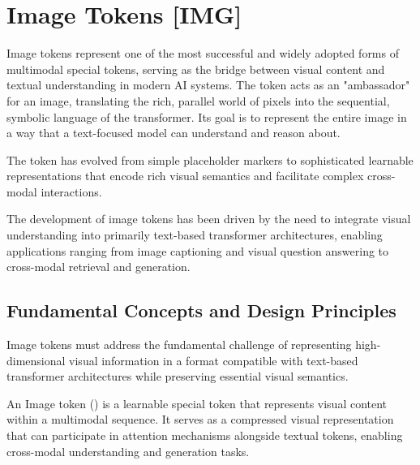 
\section{Image Tokens [IMG]}

Image tokens represent one of the most successful and widely adopted forms of multimodal special tokens, serving as the bridge between visual content and textual understanding in modern AI systems. The \img{} token acts as an "ambassador" for an image, translating the rich, parallel world of pixels into the sequential, symbolic language of the transformer. Its goal is to represent the entire image in a way that a text-focused model can understand and reason about.

The \img{} token has evolved from simple placeholder markers to sophisticated learnable representations that encode rich visual semantics and facilitate complex cross-modal interactions.

\begin{comment}
Feedback: This is a strong opening. To make the concept even more concrete, you could add an analogy: "The [IMG] token acts as an 'ambassador' for an image, translating the rich, parallel world of pixels into the sequential, symbolic language of the transformer. Its goal is to represent the entire image in a way that a text-focused model can understand and reason about."

STATUS: addressed - added ambassador analogy to make image token concept more concrete
\end{comment}

The development of image tokens has been driven by the need to integrate visual understanding into primarily text-based transformer architectures, enabling applications ranging from image captioning and visual question answering to cross-modal retrieval and generation.

\subsection{Fundamental Concepts and Design Principles}

Image tokens must address the fundamental challenge of representing high-dimensional visual information in a format compatible with text-based transformer architectures while preserving essential visual semantics.

\begin{definition}
An Image token (\img{}) is a learnable special token that represents visual content within a multimodal sequence. It serves as a compressed visual representation that can participate in attention mechanisms alongside textual tokens, enabling cross-modal understanding and generation tasks.
\end{definition}

